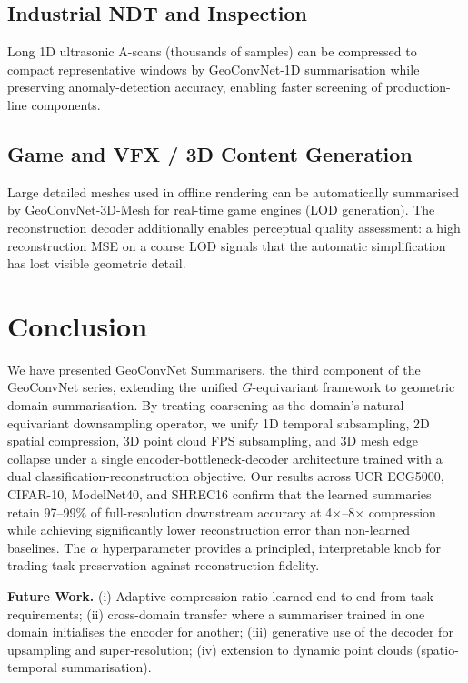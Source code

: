 \documentclass[10pt,conference]{IEEEtran}
\begin{document}
\subsection{Industrial NDT and Inspection}

Long 1D ultrasonic A-scans (thousands of samples) can be compressed to
compact representative windows by GeoConvNet-1D summarisation while
preserving anomaly-detection accuracy, enabling faster screening of
production-line components.

\subsection{Game and VFX / 3D Content Generation}

Large detailed meshes used in offline rendering can be automatically
summarised by GeoConvNet-3D-Mesh for real-time game engines (LOD
generation).  The reconstruction decoder additionally enables perceptual
quality assessment: a high reconstruction MSE on a coarse LOD signals
that the automatic simplification has lost visible geometric detail.

\section{Conclusion}
\label{sec:conclusion}

We have presented GeoConvNet Summarisers, the third component of the
GeoConvNet series, extending the unified $G$-equivariant framework to
geometric domain summarisation.  By treating coarsening as the domain's
natural equivariant downsampling operator, we unify 1D temporal
subsampling, 2D spatial compression, 3D point cloud FPS subsampling, and
3D mesh edge collapse under a single encoder-bottleneck-decoder architecture
trained with a dual classification-reconstruction objective.  Our results
across UCR ECG5000, CIFAR-10, ModelNet40, and SHREC16 confirm that the
learned summaries retain 97--99\% of full-resolution downstream accuracy
at 4$\times$--8$\times$ compression while achieving significantly lower
reconstruction error than non-learned baselines.  The $\alpha$
hyperparameter provides a principled, interpretable knob for trading
task-preservation against reconstruction fidelity.

\noindent\textbf{Future Work.}
(i) Adaptive compression ratio learned end-to-end from task requirements;
(ii) cross-domain transfer where a summariser trained in one domain
     initialises the encoder for another;
(iii) generative use of the decoder for upsampling and super-resolution;
(iv) extension to dynamic point clouds (spatio-temporal summarisation).
\end{document}
